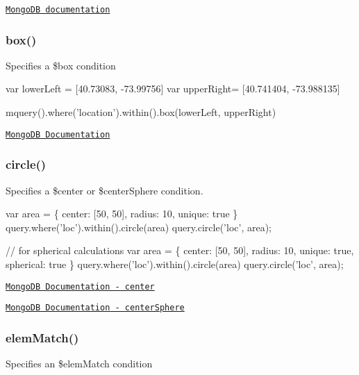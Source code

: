 \href{http://docs.mongodb.org/manual/reference/operator/and/}{\tt Mongo\+DB documentation}

\subsubsection*{box()}

Specifies a {\ttfamily \$box} condition


\begin{DoxyCode}
var lowerLeft = [40.73083, -73.99756]
var upperRight= [40.741404,  -73.988135]

mquery().where('location').within().box(lowerLeft, upperRight)
\end{DoxyCode}


\href{http://docs.mongodb.org/manual/reference/operator/box/}{\tt Mongo\+DB Documentation}

\subsubsection*{circle()}

Specifies a {\ttfamily \$center} or {\ttfamily \$center\+Sphere} condition.


\begin{DoxyCode}
var area = \{ center: [50, 50], radius: 10, unique: true \}
query.where('loc').within().circle(area)
query.circle('loc', area);

// for spherical calculations
var area = \{ center: [50, 50], radius: 10, unique: true, spherical: true \}
query.where('loc').within().circle(area)
query.circle('loc', area);
\end{DoxyCode}



\begin{DoxyItemize}
\item \href{http://docs.mongodb.org/manual/reference/operator/center/}{\tt Mongo\+DB Documentation -\/ center}
\item \href{http://docs.mongodb.org/manual/reference/operator/centerSphere/}{\tt Mongo\+DB Documentation -\/ center\+Sphere}
\end{DoxyItemize}

\subsubsection*{elem\+Match()}

Specifies an {\ttfamily \$elem\+Match} condition




